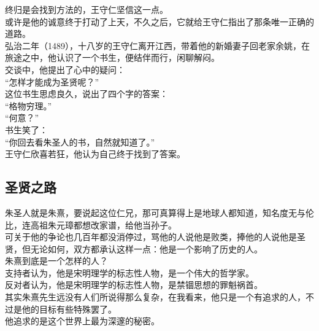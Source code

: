 \begin{multicols}{\theparacolNo}
终归是会找到方法的，王守仁坚信这一点。\\

或许是他的诚意终于打动了上天，不久之后，它就给王守仁指出了那条唯一正确的道路。\\

弘治二年（1489），十八岁的王守仁离开江西，带着他的新婚妻子回老家余姚，在旅途之中，他认识了一个书生，便结伴而行，闲聊解闷。\\

交谈中，他提出了心中的疑问：\\

“怎样才能成为圣贤呢？”\\

这位书生思虑良久，说出了四个字的答案：\\

“格物穷理。”\\

“何意？”\\

书生笑了：\\

“你回去看朱圣人的书，自然就知道了。”\\

王守仁欣喜若狂，他认为自己终于找到了答案。\\

\subsection{圣贤之路}
朱圣人就是朱熹，要说起这位仁兄，那可真算得上是地球人都知道，知名度无与伦比，连高祖朱元璋都想改家谱，给他当孙子。\\

可关于他的争论也几百年都没消停过，骂他的人说他是败类，捧他的人说他是圣贤，但无论如何，双方都承认这样一点：他是一个影响了历史的人。\\

朱熹到底是一个怎样的人？\\

支持者认为，他是宋明理学的标志性人物，是一个伟大的哲学家。\\

反对者认为，他是宋明理学的标志性人物，是禁锢思想的罪魁祸首。\\

其实朱熹先生远没有人们所说得那么复杂，在我看来，他只是一个有追求的人，不过是他的目标有些特殊罢了。\\

他追求的是这个世界上最为深邃的秘密。\\


\end{multicols}
